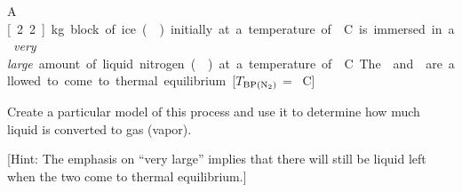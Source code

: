 \label{FNT1.2.1-6}

A \unit[2.2]{kg} block of ice () initially at a temperature of \unit[-20]{\textdegree C} is immersed in a \emph{very large} amount of liquid nitrogen () at a temperature of \unit[-196]{\textdegree C}. The  and  are allowed to come to thermal equilibrium.  [$T$$_\text{BP(\ce{N2})}$ = \unit[-196]{\textdegree C}]

Create a particular model of this process and use it to determine how much liquid  is converted to gas (vapor).

[Hint: The emphasis on ``very large'' implies that there will still be liquid  left when the two come to thermal equilibrium.]